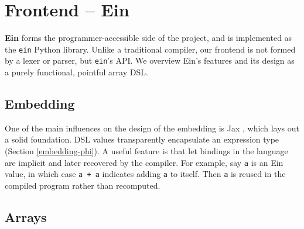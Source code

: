 \needspace{12em}
\section{Frontend -- Ein}
\label{ein-dsl}

\textbf{Ein} forms the programmer-accessible side of the project, and is implemented as the \texttt{ein} Python library. Unlike a traditional compiler, our frontend is not formed by a lexer or parser, but \texttt{ein}'s API. We overview Ein's features and its design as a purely functional, pointful array DSL.

\subsection{Embedding}

One of the main influences on the design of the embedding is Jax \cite{frostig2018compiling}, which lays out a solid foundation.
DSL values transparently encapsulate an expression type (Section \ref{embedding-phi}).
A useful feature is that let bindings in the language are implicit and later recovered by the compiler.
For example, say \texttt{a} is an Ein value, in which case \texttt{a + a} indicates adding \texttt{a} to itself. 
Then \texttt{a} is reused in the compiled program rather than recomputed.

\subsection{Arrays}

